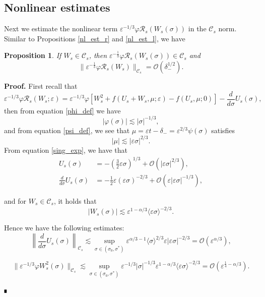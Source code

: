 \documentclass[letterpaper,11pt]{article}
\newcommand{\Ral}{\mathcal{R}}
\newcommand{\rmO}{\mathcal{O}}
\newcommand{\eps}{\varepsilon}
\newcommand{\lar}{ \lesssim }
\numberwithin{equation}{section}
\theoremstyle{plain}
\newtheorem{proposition}[theorem]{Proposition}
\newenvironment{Proof}[1][.]%
 {\begin{trivlist}\item[]\textbf{Proof#1 }}%
 {\hspace*{\fill}$\rule{0.3\baselineskip}{0.35\baselineskip}$\end{trivlist}}
\begin{document}
\subsection{Nonlinear estimates}
Next we estimate the nonlinear term $\eps^{-1/3}\varphi \Ral_s(W_s(\sigma))$ in the $\mathcal{C}_s$ norm. Similar to Propositions \ref{nl_est_r} and \ref{nl_est_l}, we have
\begin{proposition}\label{nl_est_s} If $W_s \in \mathcal{C}_s$, then $\eps^{-\frac{1}{3}}\varphi \Ral_s(W_s(\sigma))  \in \mathcal{C}_{s}$ and 
\begin{equation}\label{nl_est:Rs}
\| \eps^{-\frac{1}{3}}\varphi \Ral_s(W_s) \|_{\mathcal{C}_s} = \rmO(\delta_-^{1/2}).
\end{equation}
\end{proposition}

\begin{Proof}
First recall that
\[
\eps^{-1/3}\varphi\Ral_s(W_s;\eps) = \eps^{-1/3}\varphi\left[  W_s^2+ f(U_s+W_s, \mu ; \eps)-f(U_s,\mu;0) \right]- \frac{d}{d\sigma}U_s(\sigma),
\]
then from equation \eqref{phi_def} we have
\[
|\varphi(\sigma)|  \lar | \sigma |^{-1/3},
\]
and from equation \eqref{psi_def}, we see that $\mu = \eps t -\delta_- = \eps^{2/3} \psi(\sigma)$ satisfies
\[
|\mu | \lar |\eps\sigma|^{2/3}.
\] 
From equation \eqref{sing_exp}, we have that
\begin{align*}
U_s(\sigma)  &= -\left(\frac{3}{2}\eps \sigma\right)^{1/3} + \rmO(|\eps \sigma|^{2/3} ),
\\
\frac{d}{d\sigma}U_s(\sigma) &= -\frac{1}{2}\eps(\eps\sigma)^{-2/3} + \rmO(\eps|\eps \sigma|^{-1/3}),
\end{align*}

and for $W_s \in \mathcal{C}_s$, it holds that
\[
|W_s(\sigma)| \lar \eps^{1-\alpha/3}\langle \eps \sigma\rangle^{-2/3}.
\]

Hence we have the following estimates:
\begin{equation}\label{nl_est:Rs_1}
\left\|\frac{d}{d\sigma}U_s(\sigma) \right\|_{\mathcal{C}_s}  \lar \sup_{\sigma \in (\sigma_0, \sigma^{*})}\eps^{\alpha/3-1}\langle \sigma\rangle^{2/3} \eps|\eps \sigma|^{-2/3} = \rmO(\eps^{\alpha/3}),
\end{equation}

\begin{equation}\label{nl_est:Rs_2}
\|\eps^{-1/3}\varphi W_s^2(\sigma) \|_{\mathcal{C}_s}  \lar \sup_{\sigma \in (\sigma_0, \sigma^{*})}\eps^{-1/3}|\sigma|^{-1/3}\eps^{1-\alpha/3}\langle \eps \sigma\rangle^{-2/3} = \rmO(\eps^{\frac{1}{4}-\alpha/3}).
\end{equation}


\end{Proof}
\end{document}
